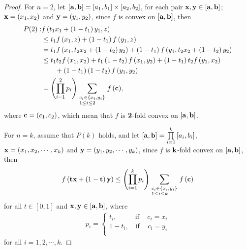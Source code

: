 \documentclass{amsart}
\theoremstyle{plain}
\numberwithin{equation}{section}
\begin{document}
\begin{proof}
For $n=2$, let $\left[ {{\bf{a}},{\bf{b}}} \right]=\left[
{a_1,b_1} \right]\times \left[ {a_2,b_2} \right]$, for each pair
${\bf{x}},{\bf{y}}\in \left[ {{\bf{a}},{\bf{b}}} \right]$;
${\bf{x}} = (x_1,x_2)$ and ${\bf{y}}=(y_1,y_2)$, since $f$ is
convex on $\left[ {{\bf{a}},{\bf{b}}} \right]$, then
\begin{align}
P(2): &f\left( {t_1 x_1  + \left( {1 - t_1 } \right)y_1 ,z}
\right)
\nonumber\\
&\le t_1 f\left( {x_1 ,z} \right) + \left( {1 - t_1 }
\right)f\left( {y_1 ,z} \right)\nonumber
 \\
&= t_1 f\left( {x_1 ,t_2 x_2  + \left( {1 - t_2 } \right)y_2 }
\right) + \left( {1 - t_1 } \right)f\left( {y_1 ,t_2 x_2  + \left(
{1 - t_2 } \right)y_2 } \right)\nonumber
  \\
&\le t_1 t_2 f\left( {x_1 ,x_2 } \right) + t_1 \left( {1 - t_2 }
\right)f\left( {x_1 ,y_2 } \right) + \left( {1 - t_1 } \right)t_2
f\left( {y_1 ,x_2 } \right)\nonumber
\\
&\qquad+ \left( {1 - t_1 } \right)\left( {1 - t_2 } \right)f\left(
{y_1 ,y_2 } \right)\nonumber
\\
&=\left( {\prod\limits_{i = 1}^2 {p_i } }
\right)\sum\limits_{\scriptstyle c_i  \in \left\{ {x_i ,y_i }
\right\} \hfill \atop
  \scriptstyle 1 \le i \le 2 \hfill} {f\left( {\bf{c}} \right)},
\end{align}
where ${\bf{c}}=(c_1,c_2)$, which mean that $f$ is ${\bf{2}}$-fold
convex on $\left[ {{\bf{a}},{\bf{b}}} \right]$.

For $n=k$, assume that $P(k)$ holds, and let $\left[
{{\bf{a}},{\bf{b}}} \right] =\prod\limits_{i = 1}^k {\left[ {a_i
,b_i } \right]} $, ${\bf{x}} = (x_1,x_2,\cdots,x_k)$ and
${\bf{y}}=(y_1,y_2,\cdots,y_k)$, since $f$ is ${\bf{k}}$-fold
convex on $\left[ {{\bf{a}},{\bf{b}}} \right]$, then
\begin{align}
f\left( {{\bf{t}}{\bf{x}} + \left( {1 - {\bf{t}}} \right){\bf{y}}}
\right) \le
 \left( {\prod\limits_{i = 1}^k {p_i } }
\right)\sum\limits_{\scriptstyle c_i  \in \left\{ {x_i ,y_i }
\right\} \hfill \atop
  \scriptstyle 1 \le i \le k \hfill} {f\left( {\bf{c}}
  \right)}\label{eq2.5}
\end{align}
for all $t\in [0,1]$ and ${\bf{x}},{\bf{y}} \in\left[
{{\bf{a}},{\bf{b}}} \right]$, where
\begin{align*}
p_i  = \left\{ \begin{array}{l}
 t_i ,\,\,\,\,\,\,\,\,\,\,\,\,\,\,\,\,\text{if}\,\,\,\,\,\,\,c_i  = x_i  \\
 1 - t_i ,\,\,\,\,\,\,\text{if}\,\,\,\,\,\,\,c_i  = y_i  \\
 \end{array} \right.
\end{align*}
for all $i=1,2,\cdots, k$.


\end{proof}
\end{document}
